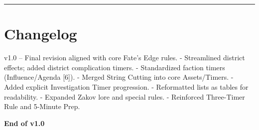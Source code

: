\documentclass[11pt]{article}
\newcommand{\sectionrule}{\vspace{0.5em}\noindent\textcolor{gray}{\rule{\textwidth}{0.4pt}}\par\vspace{0.5em}}
\begin{document}
\sectionrule

\section*{Changelog}
v1.0 -- Final revision aligned with core Fate's Edge rules.  
- Streamlined district effects; added district complication timers.  
- Standardized faction timers (Influence/Agenda [6]).  
- Merged String Cutting into core Assets/Timers.  
- Added explicit Investigation Timer progression.  
- Reformatted lists as tables for readability.  
- Expanded Zakov lore and special rules.  
- Reinforced Three-Timer Rule and 5-Minute Prep.  

\textbf{End of v1.0}


\end{document}
